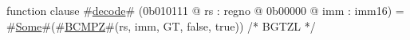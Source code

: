function clause #\hyperref[zdecode]{decode}# (0b010111 @ rs : regno @ 0b00000 @ imm : imm16) =
  #\hyperref[zSome]{Some}#(#\hyperref[zBCMPZ]{BCMPZ}#(rs, imm, GT, false, true))  /* BGTZL */
